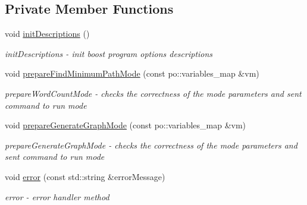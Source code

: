 \subsection*{Private Member Functions}
\begin{DoxyCompactItemize}
\item 
void \hyperlink{a00002_a1b6572cd3eb0aa505441759700679680_a1b6572cd3eb0aa505441759700679680}{init\+Descriptions} ()
\begin{DoxyCompactList}\small\item\em init\+Descriptions -\/ init boost program options descriptions \end{DoxyCompactList}\item 
void \hyperlink{a00002_a6d3c420cce837286647b227f1dc3c5d9_a6d3c420cce837286647b227f1dc3c5d9}{prepare\+Find\+Minimum\+Path\+Mode} (const po\+::variables\+\_\+map \&vm)
\begin{DoxyCompactList}\small\item\em prepare\+Word\+Count\+Mode -\/ checks the correctness of the mode parameters and sent command to run mode \end{DoxyCompactList}\item 
void \hyperlink{a00002_af2d4ef90c6ccee55da52f5a5a1c69693_af2d4ef90c6ccee55da52f5a5a1c69693}{prepare\+Generate\+Graph\+Mode} (const po\+::variables\+\_\+map \&vm)
\begin{DoxyCompactList}\small\item\em prepare\+Generate\+Graph\+Mode -\/ checks the correctness of the mode parameters and sent command to run mode \end{DoxyCompactList}\item 
void \hyperlink{a00002_a87a2f3f5782023b4ed03aedc00094c01_a87a2f3f5782023b4ed03aedc00094c01}{error} (const std\+::string \&error\+Message)
\begin{DoxyCompactList}\small\item\em error -\/ error handler method \end{DoxyCompactList}\end{DoxyCompactItemize}

